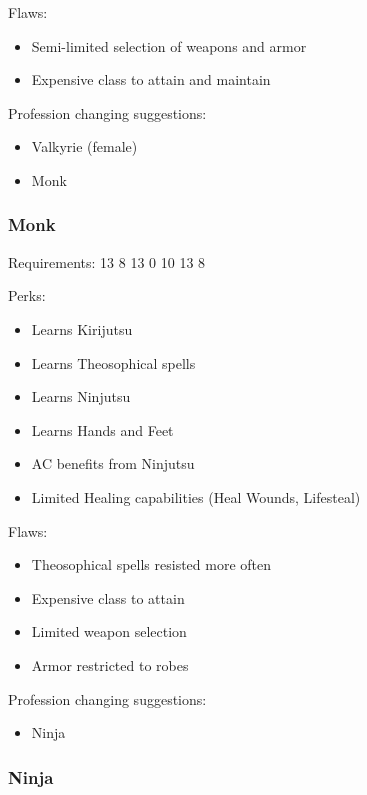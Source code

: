\documentclass[12pt]{article}
\providecommand{\tightlist}{%
  \setlength{\itemsep}{0pt}\setlength{\parskip}{0pt}}
\begin{document}
Flaws:

\begin{itemize}
\item
  Semi-limited selection of weapons and armor
\item
  Expensive class to attain and maintain
\end{itemize}

Profession changing suggestions:

\begin{itemize}
\tightlist
\item
  Valkyrie (female)
\item
  Monk
\end{itemize}

\subsubsection{Monk}\label{monk}

Requirements: 13 8 13 0 10 13 8

Perks:

\begin{itemize}
\item
  Learns Kirijutsu
\item
  Learns Theosophical spells
\item
  Learns Ninjutsu
\item
  Learns Hands and Feet
\item
  AC benefits from Ninjutsu
\item
  Limited Healing capabilities (Heal Wounds, Lifesteal)
\end{itemize}

Flaws:

\begin{itemize}
\item
  Theosophical spells resisted more often
\item
  Expensive class to attain
\item
  Limited weapon selection
\item
  Armor restricted to robes
\end{itemize}

Profession changing suggestions:

\begin{itemize}
\tightlist
\item
  Ninja
\end{itemize}

\subsubsection{Ninja}\label{ninja}
\end{document}
